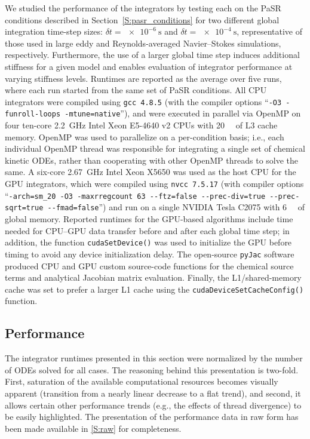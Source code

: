 \documentclass[preprint]{elsarticle}
\begin{document}
We studied the performance of the integrators by testing each on the PaSR conditions described in Section~\ref{S:pasr_conditions} for two different global integration time-step sizes: $\delta t = \SI{e-6}{\s}$ and $\delta t = \SI{e-4}{\s}$, representative of those used in large eddy and Reynolds-averaged Navier--Stokes simulations, respectively.
Furthermore, the use of a larger global time step induces additional stiffness for a given model and enables evaluation of integrator performance at varying stiffness levels.
Runtimes are reported as the average over five runs, where each run started from the same set of PaSR conditions.
All CPU integrators were compiled using \texttt{gcc 4.8.5} (with the compiler options ``\texttt{-O3 -funroll-loops -mtune=native}''), and were executed in parallel via OpenMP on four ten-core \SI{2.2}{\giga\hertz} Intel Xeon E5-4640 v2 CPUs with \SI{20}{\mega\byte} of L3 cache memory.
OpenMP was used to parallelize on a per-condition basis; i.e., each individual OpenMP thread was responsible for integrating a single set of chemical kinetic ODEs, rather than cooperating with other OpenMP threads to solve the same.
A six-core \SI{2.67}{\giga\hertz} Intel Xeon X5650 was used as the host CPU for the GPU integrators, which were compiled using \texttt{nvcc 7.5.17} (with compiler options ``\texttt{-arch=sm\_20 -O3 -maxrregcount 63 -{}-ftz=false -{}-prec-div=true -{}-prec-sqrt=true -{}-fmad=false}'') and run on a single NVIDIA Tesla C2075 with \SI{6}{\giga\byte} of global memory.
Reported runtimes for the GPU-based algorithms include time needed for CPU--GPU data transfer before and after each global time step; in addition, the function \texttt{cudaSetDevice()} was used to initialize the GPU before timing to avoid any device initialization delay.
The open-source \texttt{pyJac} software~\cite{niemeyer_2016_51139,Niemeyer:2015ws,Niemeyer:2016aa} produced CPU and GPU custom source-code functions for the chemical source terms and analytical Jacobian matrix evaluation.
Finally, the L1\slash shared-memory cache was set to prefer a larger L1 cache using the \texttt{cudaDeviceSetCacheConfig()} function.

\subsection{Performance}

The integrator runtimes presented in this section were normalized by the number of ODEs solved for all cases.
The reasoning behind this presentation is two-fold.
First, saturation of the available computational resources becomes visually apparent (transition from a nearly linear decrease to a flat trend), and second, it allows certain other performance trends (e.g., the effects of thread divergence) to be easily highlighted.
The presentation of the performance data in raw form has been made available in \ref{S:raw} for completeness.
\end{document}
